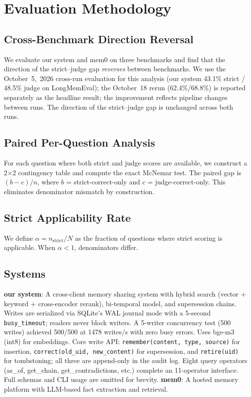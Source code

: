 \documentclass{llncs}
\begin{document}
\section{Evaluation Methodology}


\subsection{Cross-Benchmark Direction Reversal}
We evaluate our system and mem0 on three benchmarks and find that the direction of the strict--judge gap \emph{reverses} between benchmarks. We use the October~5,~2026 cross-run evaluation for this analysis (our system 43.1\% strict / 48.5\% judge on LongMemEval); the October~18 rerun (62.4\%/68.8\%) is reported separately as the headline result; the improvement reflects pipeline changes between runs. The direction of the strict--judge gap is unchanged across both runs.

\subsection{Paired Per-Question Analysis}
For each question where both strict and judge scores are available, we construct a 2$\times$2 contingency table and compute the exact McNemar test. The paired gap is $(b - c)/n$, where $b$ = strict-correct-only and $c$ = judge-correct-only. This eliminates denominator mismatch by construction.

\subsection{Strict Applicability Rate}
We define $\alpha = n_{\text{strict}}/N$ as the fraction of questions where strict scoring is applicable. When $\alpha < 1$, denominators differ.

\subsection{Systems}
\textbf{our system}: A cross-client memory sharing system with hybrid search (vector + keyword + cross-encoder rerank), bi-temporal model, and supersession chains. Writes are serialized via SQLite's WAL journal mode with a 5-second \texttt{busy\_timeout}; readers never block writers. A 5-writer concurrency test (500 writes) achieved 500/500 at 1{}478 writes/s with zero busy errors. Uses bge-m3 (int8) for embeddings. Core write API: \texttt{remember(content, type, source)} for insertion, \texttt{correct(old\_uid, new\_content)} for supersession, and \texttt{retire(uid)} for tombstoning; all three are append-only in the audit log. Eight query operators (as\_of, get\_chain, get\_contradictions, etc.) complete an 11-operator interface. Full schemas and CLI usage are omitted for brevity.
\textbf{mem0}: A hosted memory platform with LLM-based fact extraction and retrieval.
\end{document}
